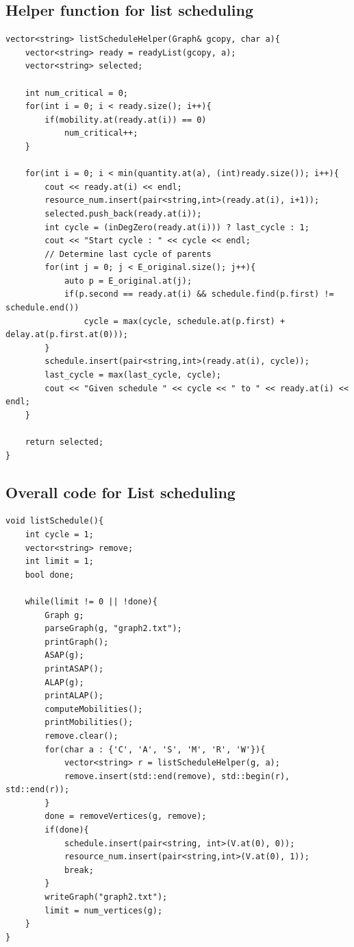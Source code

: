\documentclass[letterpaper, 10 pt, conference]{ieeeconf}  %
\begin{document}
\subsection{Helper function for list scheduling}
\label{listhelp}
\begin{verbatim}
vector<string> listScheduleHelper(Graph& gcopy, char a){
    vector<string> ready = readyList(gcopy, a);
    vector<string> selected;

    int num_critical = 0;
    for(int i = 0; i < ready.size(); i++){
        if(mobility.at(ready.at(i)) == 0)
            num_critical++;
    }

    for(int i = 0; i < min(quantity.at(a), (int)ready.size()); i++){
        cout << ready.at(i) << endl;
        resource_num.insert(pair<string,int>(ready.at(i), i+1));
        selected.push_back(ready.at(i));
        int cycle = (inDegZero(ready.at(i))) ? last_cycle : 1;
        cout << "Start cycle : " << cycle << endl;
        // Determine last cycle of parents
        for(int j = 0; j < E_original.size(); j++){
            auto p = E_original.at(j);
            if(p.second == ready.at(i) && schedule.find(p.first) != schedule.end())
                cycle = max(cycle, schedule.at(p.first) + delay.at(p.first.at(0)));
        }
        schedule.insert(pair<string,int>(ready.at(i), cycle));
        last_cycle = max(last_cycle, cycle);
        cout << "Given schedule " << cycle << " to " << ready.at(i) << endl;
    }

    return selected;
}
\end{verbatim}

\subsection{Overall code for List scheduling}
\label{list}
\begin{verbatim}
void listSchedule(){
    int cycle = 1;
    vector<string> remove;
    int limit = 1;
    bool done;

    while(limit != 0 || !done){
        Graph g;
        parseGraph(g, "graph2.txt");
        printGraph();
        ASAP(g);
        printASAP();
        ALAP(g);
        printALAP();
        computeMobilities();
        printMobilities();
        remove.clear();
        for(char a : {'C', 'A', 'S', 'M', 'R', 'W'}){
            vector<string> r = listScheduleHelper(g, a);
            remove.insert(std::end(remove), std::begin(r), std::end(r));
        }
        done = removeVertices(g, remove);
        if(done){
            schedule.insert(pair<string, int>(V.at(0), 0));
            resource_num.insert(pair<string,int>(V.at(0), 1));
            break;
        }
        writeGraph("graph2.txt");
        limit = num_vertices(g);
    }    
}
\end{verbatim}
\end{document}

